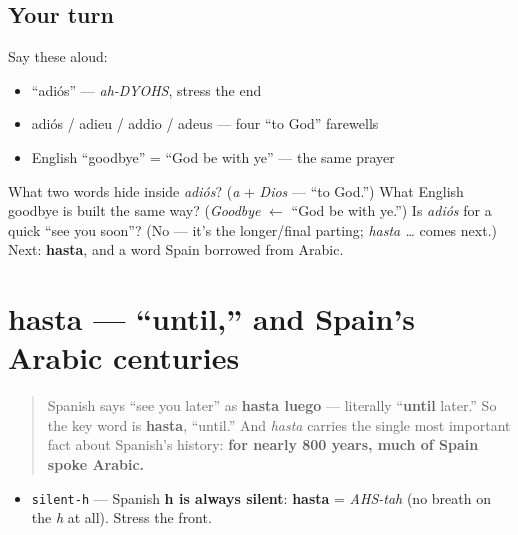 \subsection*{Your turn}
Say these aloud:

\begin{itemize}
\raggedright
  \item \textquotedblleft{}adiós\textquotedblright{} — \emph{ah-DYOHS}, stress the end
  \item adiós / adieu / addio / adeus — four \textquotedblleft{}to God\textquotedblright{} farewells
  \item English \textquotedblleft{}goodbye\textquotedblright{} = \textquotedblleft{}God be with ye\textquotedblright{} — the same prayer
\end{itemize}

\begin{tcolorbox}[breakable,colback=teal!4,colframe=teal!35!black,title={Before you move on}]
What two words hide inside \emph{adiós}? (\emph{a} + \emph{Dios} — \textquotedblleft{}to God.\textquotedblright{}) What English goodbye is built the same way? (\emph{Goodbye} $\leftarrow$ \textquotedblleft{}God be with ye.\textquotedblright{}) Is \emph{adiós} for a quick \textquotedblleft{}see you soon\textquotedblright{}? (No — it's the longer/final parting; \emph{hasta …} comes next.) Next: \textbf{hasta}, and a word Spain borrowed from Arabic.
\end{tcolorbox}
\section[hasta]{hasta — \textquotedblleft{}until,\textquotedblright{} and Spain's Arabic centuries}

\label{lesson:ES-C05-hasta}



\begin{quote}
Spanish says \textquotedblleft{}see you later\textquotedblright{} as \textbf{hasta luego} — literally \textquotedblleft{}\textbf{until} later.\textquotedblright{} So the key word is \textbf{hasta}, \textquotedblleft{}until.\textquotedblright{} And \emph{hasta} carries the single most important fact about Spanish's history: \textbf{for nearly 800 years, much of Spain spoke Arabic.}
\end{quote}

\begin{sounds}
\begin{itemize}
\raggedright
  \item \texttt{silent-h} — Spanish \textbf{h is always silent}: \textbf{hasta} = \emph{AHS-tah} (no breath on the \emph{h} at all). Stress the front.
\end{itemize}
\end{sounds}

